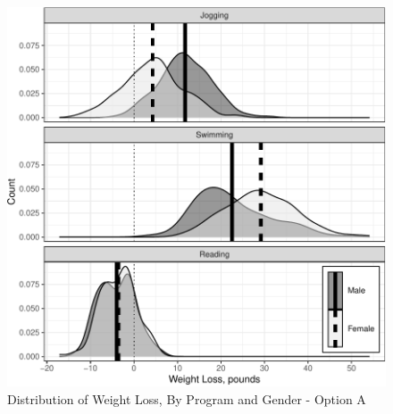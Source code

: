 \documentclass[
]{article}
\begin{document}
\begin{figure}[hb]

\includegraphics{Appendix_ex_weightloss_files/figure-latex/unnamed-chunk-33-1} \hfill{}

\caption{Distribution of Weight Loss, By Program and Gender - Option A}\label{fig:unnamed-chunk-33}
\end{figure}

\clearpage
\end{document}

